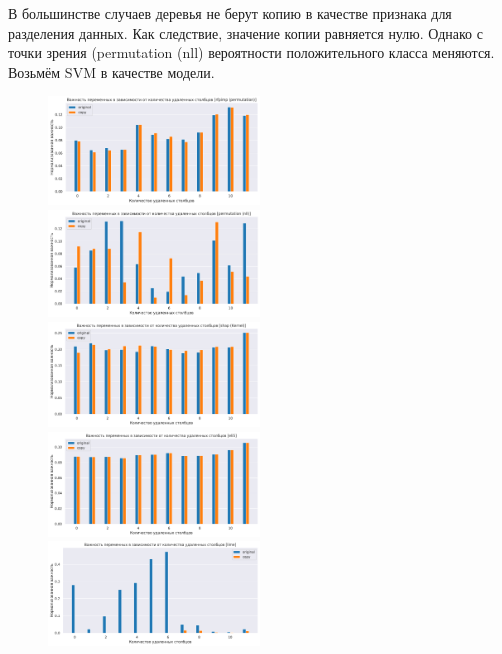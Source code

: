 \documentclass[12pt]{article}
\begin{document}
В большинстве случаев деревья не берут копию в качестве признака для разделения данных. Как следствие, значение копии равняется нулю. Однако с точки зрения (permutation (nll) вероятности положительного класса меняются.
\newpage
Возьмём SVM в качестве модели.
\begin{figure}[h]
        \includegraphics[width=0.5\textwidth]{images/art1_original_copy_svm_rfpimp (permutation).pdf}
        \includegraphics[width=0.5\textwidth]{images/art1_original_copy_svm_permutation (nll).pdf}
        \includegraphics[width=0.5\textwidth]{images/art1_original_copy_svm_shap (Kernel).pdf}
        \includegraphics[width=0.5\textwidth]{images/art1_original_copy_svm_eli5.pdf}
        \hfill
        \includegraphics[width=0.5\textwidth]{images/art1_original_copy_svm_lime.pdf}

\end{figure}
\end{document}
